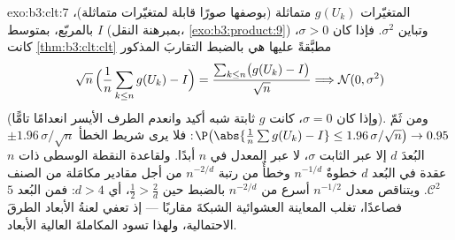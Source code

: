 \begin{solution}{exo:b3:clt:7}
المتغيّرات $g(U_k)$  متماثلة (بوصفها صورًا قابلة 
لمتغيّرات  متماثلة)،  بالمربّع، بمتوسط $I$
(بمبرهنة النقل، \cref{exo:b3:product:9}) وتباين $\sigma^2$. فإذا كان
$\sigma > 0$، كانت \cref{thm:b3:clt:clt} مطبَّقةً عليها هي بالضبط التقاربَ
المذكور
\[
\sqrt n\,\Bigl(\frac1n\sum_{k\leq n}g(U_k) - I\Bigr) =
\frac{\sum_{k\leq n}\bigl(g(U_k) - I\bigr)}{\sqrt n}
\Longrightarrow \mathcal N(0, \sigma^2)
\]
(وإذا كان $\sigma = 0$، كانت $g$ ثابتة شبه أكيد وانعدم الطرف
الأيسر انعدامًا تامًّا). ومن ثَمّ $\P\bigl(\abs{\frac1n\sum g(U_k) - I} \leq
1.96\,\sigma/\sqrt n\bigr) \to 0.95$: فلا يرى شريط الخطأ
$\pm
1.96\,\sigma/\sqrt n$ البُعدَ $d$ إلا عبر الثابت $\sigma$، لا عبر المعدل في
$n$ أبدًا. ولقاعدة النقطة الوسطى ذات $n$ عقدة في البُعد $d$
خطوةٌ $n^{-1/d}$ وخطأٌ من رتبة $n^{-2/d}$ من أجل مقادير مكامَلة
من الصنف $\mathcal C^2$. ويتناقص معدل  $n^{-1/2}$
أسرع من $n^{-2/d}$ بالضبط حين $\frac12 > \frac2d$، أي $d > 4$: فمن البُعد
$5$ فصاعدًا، تغلب المعاينة العشوائية الشبكةَ مقاربًا --- إذ
تعفي لعنةُ الأبعاد الطرقَ الاحتمالية، ولهذا تسود 
المكاملةَ العالية الأبعاد.
\end{solution}

